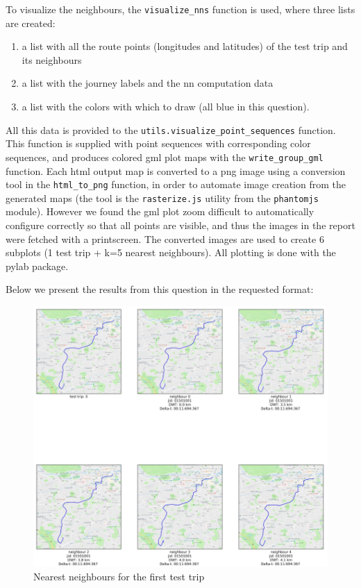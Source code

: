 \documentclass[12pt]{article}
\begin{document}
	
  To visualize the neighbours, the \texttt{visualize\_nns}
  function is used, where three lists are created:
  \begin{enumerate}
    \item a list with all the route points (longitudes and latitudes) of the
      test trip and its neighbours
    \item a list with the journey labels and the nn computation data
      \item a list with the colors with which to draw (all blue in this
        question).
      \end{enumerate}
      All this data is provided to the
      \texttt{utils.visualize\_point\_sequences} function. This function is
      supplied with point sequences with corresponding color sequences, and
      produces colored gml plot maps with the \texttt{write\_group\_gml}
      function. Each html output map is converted to a png image using a conversion tool in the \texttt{html\_to\_png} function, in
order to automate image creation from the generated maps (the tool is the
\texttt{rasterize.js} utility from the \texttt{phantomjs} module).
However we found the gml plot zoom difficult to automatically configure correctly so that
all points are visible, and thus the images in the report were fetched with a printscreen.
The converted images are used to create 6 subplots (1 test trip + k=5 nearest
neighbours). All plotting is done with the pylab package.

	Below we present the results from this question in the requested format:
	
	\begin{figure} [H]
		\begin{center}
			\includegraphics [scale = 0.60] {nn1.png}
			\caption{Nearest neighbours for the first test trip}
		\end{center}
	\end{figure} 
\end{document}
